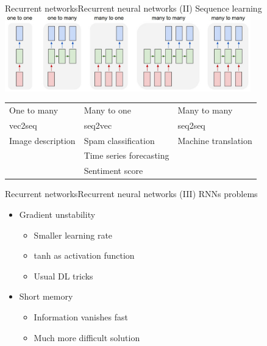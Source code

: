 \documentclass[10pt,compress]{beamer} %
\begin{document}
\begin{frame}{Recurrent networks}{Recurrent neural networks (II)}
	\centering
    Sequence learning
    \bigskip
        \includegraphics[width=0.8\textwidth]{figs/seq2seq.jpg}

    \begin{table}
    \centering
    \begin{tabular}{l|l|l}
    One to many & Many to one & Many to many\\
    vec2seq     & seq2vec     & seq2seq\\\hline
    Image description & Spam classification & Machine translation \\
                & Time series forecasting & \\
                & Sentiment score         & \\
    \end{tabular}
    \end{table}
\end{frame}



\begin{frame}{Recurrent networks}{Recurrent neural networks (III)}
    RNNs problems
    \begin{itemize}
        \item Gradient unstability
            \begin{itemize}
            \item Smaller learning rate
            \item tanh as activation function
            \item Usual DL tricks
            \end{itemize}
        \item Short memory
            \begin{itemize}
            \item Information vanishes fast
            \item Much more difficult solution
            \end{itemize}
    \end{itemize}
\end{frame}
\end{document}
